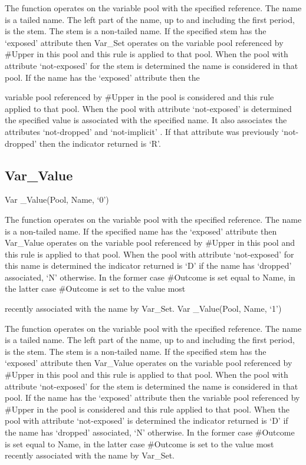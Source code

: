 The function operates on the variable pool with the specified reference.
The name is a tailed name. The left part of the name, up to and
including the first period, is the stem. The stem is a non-tailed name.
If the specified stem has the `exposed' attribute then Var\_Set operates
on the variable pool referenced by \#Upper in this pool and this rule is
applied to that pool. When the pool with attribute `not-exposed' for the
stem is determined the name is considered in that pool. If the name has
the `exposed' attribute then the

variable pool referenced by \#Upper in the pool is considered and this
rule applied to that pool. When the pool with attribute `not-exposed' is
determined the specified value is associated with the specified name. It
also associates the attributes `not-dropped' and `not-implicit' . If
that attribute was previously `not-dropped' then the indicator returned
is `R'.

\subsection{Var\_Value}\label{var_value}

Var \_Value(Pool, Name, `0')

The function operates on the variable pool with the specified reference.
The name is a non-tailed name. If the specified name has the `exposed'
attribute then Var\_Value operates on the variable pool referenced by
\#Upper in this pool and this rule is applied to that pool. When the
pool with attribute `not-exposed' for this name is determined the
indicator returned is `D' if the name has `dropped' associated, `N'
otherwise. In the former case \#Outcome is set equal to Name, in the
latter case \#Outcome is set to the value most

recently associated with the name by Var\_Set. Var \_Value(Pool, Name,
`1')

The function operates on the variable pool with the specified reference.
The name is a tailed name. The left part of the name, up to and
including the first period, is the stem. The stem is a non-tailed name.
If the specified stem has the `exposed' attribute then Var\_Value
operates on the variable pool referenced by \#Upper in this pool and
this rule is applied to that pool. When the pool with attribute
`not-exposed' for the stem is determined the name is considered in that
pool. If the name has the `exposed' attribute then the variable pool
referenced by \#Upper in the pool is considered and this rule applied to
that pool. When the pool with attribute `not-exposed' is determined the
indicator returned is `D' if the name has `dropped' associated, `N'
otherwise. In the former case \#Outcome is set equal to Name, in the
latter case \#Outcome is set to the value most recently associated with
the name by Var\_Set.

